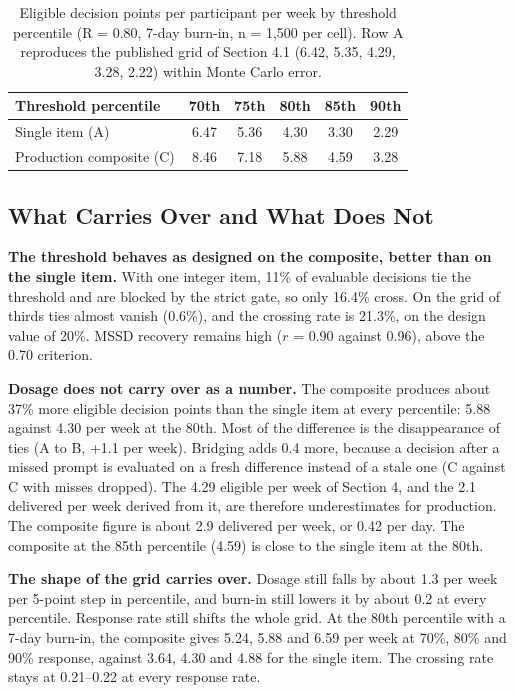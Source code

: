 \documentclass[11pt,letterpaper]{article}
\begin{document}
\begin{table}[htbp]
\centering
\small
\begin{tabular}{@{}lccccc@{}}
\toprule
\textbf{Threshold percentile} & 70th & 75th & 80th & 85th & 90th \\
\midrule
Single item (A) & 6.47 & 5.36 & 4.30 & 3.30 & 2.29 \\
Production composite (C) & 8.46 & 7.18 & 5.88 & 4.59 & 3.28 \\
\bottomrule
\end{tabular}
\caption{Eligible decision points per participant per week by threshold percentile (R = 0.80, 7-day burn-in, n = 1,500 per cell). Row A reproduces the published grid of Section 4.1 (6.42, 5.35, 4.29, 3.28, 2.22) within Monte Carlo error.}
\label{tab:composite-grid}
\end{table}

\subsection{What Carries Over and What Does Not}

\textbf{The threshold behaves as designed on the composite, better than on the single item.} With one integer item, 11\% of evaluable decisions tie the threshold and are blocked by the strict gate, so only 16.4\% cross. On the grid of thirds ties almost vanish (0.6\%), and the crossing rate is 21.3\%, on the design value of 20\%. MSSD recovery remains high ($r$ = 0.90 against 0.96), above the 0.70 criterion.

\textbf{Dosage does not carry over as a number.} The composite produces about 37\% more eligible decision points than the single item at every percentile: 5.88 against 4.30 per week at the 80th. Most of the difference is the disappearance of ties (A to B, +1.1 per week). Bridging adds 0.4 more, because a decision after a missed prompt is evaluated on a fresh difference instead of a stale one (C against C with misses dropped). The 4.29 eligible per week of Section 4, and the 2.1 delivered per week derived from it, are therefore underestimates for production. The composite figure is about 2.9 delivered per week, or 0.42 per day. The composite at the 85th percentile (4.59) is close to the single item at the 80th.

\textbf{The shape of the grid carries over.} Dosage still falls by about 1.3 per week per 5-point step in percentile, and burn-in still lowers it by about 0.2 at every percentile. Response rate still shifts the whole grid. At the 80th percentile with a 7-day burn-in, the composite gives 5.24, 5.88 and 6.59 per week at 70\%, 80\% and 90\% response, against 3.64, 4.30 and 4.88 for the single item. The crossing rate stays at 0.21--0.22 at every response rate.
\end{document}
